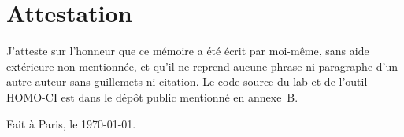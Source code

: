 \chapter*{Attestation}

J'atteste sur l'honneur que ce mémoire a été écrit par moi-même,
sans aide extérieure non mentionnée, et qu'il ne reprend aucune
phrase ni paragraphe d'un autre auteur sans guillemets ni
citation. Le code source du lab et de l'outil HOMO-CI est dans le
dépôt public mentionné en annexe~B.

\vspace{2cm}

Fait à Paris, le \today.

\vspace{1cm}

\memAuthor
